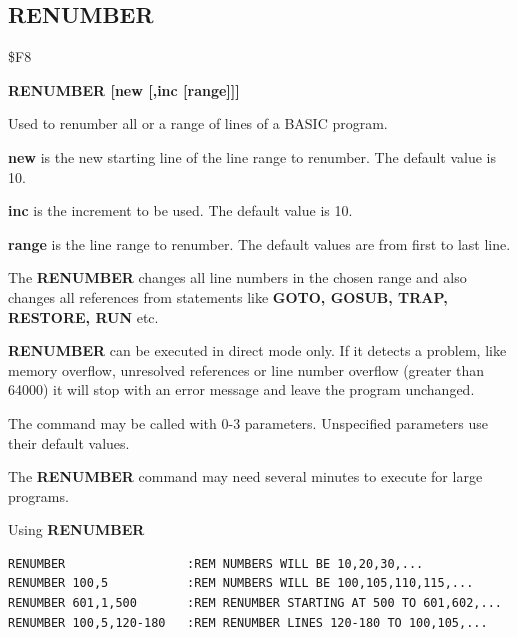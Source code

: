 
\newpage
\subsection{RENUMBER}
\begin{description}[leftmargin=2cm,style=nextline]
\item [Token:] \$F8
\item [Format:] {\bf RENUMBER [new [,inc [range]]]}
\item [Usage:] Used to renumber all or
               a range of lines of a BASIC program.

               {\bf new } is the new starting line of the
               line range to renumber.
               The default value is 10.

               {\bf inc } is the increment to be used.
               The default value is 10.

               {\bf range } is the line range to renumber.
               The default values are from first to last line.

               The {\bf RENUMBER} changes all line numbers in
               the chosen range and also changes all references
               from statements like {\bf GOTO, GOSUB, TRAP,
               RESTORE, RUN} etc.

               {\bf RENUMBER} can be executed in direct mode only.
               If it detects a problem, like memory overflow,
               unresolved references or line number overflow
               (greater than 64000) it will stop with an error
               message and leave the program unchanged.

               The command may be called with 0-3 parameters.
               Unspecified parameters use their default values.

\item [Remarks:] The {\bf RENUMBER} command may need several
                 minutes to execute for large programs.

\item [Example:] Using {\bf RENUMBER}
\begin{tcolorbox}[colback=black,coltext=white]
\verbatimfont{\codefont}
\begin{verbatim}
RENUMBER                 :REM NUMBERS WILL BE 10,20,30,...
RENUMBER 100,5           :REM NUMBERS WILL BE 100,105,110,115,...
RENUMBER 601,1,500       :REM RENUMBER STARTING AT 500 TO 601,602,...
RENUMBER 100,5,120-180   :REM RENUMBER LINES 120-180 TO 100,105,...
\end{verbatim}
\end{tcolorbox}
\end{description}

